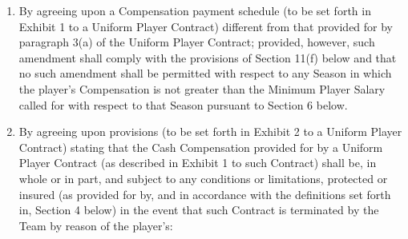 \documentclass[
]{book}
\begin{document}
\begin{enumerate}
\item
  By agreeing upon a Compensation payment schedule (to be set forth in Exhibit 1 to a Uniform Player Contract) different from that provided for by paragraph 3(a) of the Uniform Player Contract; provided, however, such amendment shall comply with the provisions of Section 11(f) below and that no such amendment shall be permitted with respect to any Season in which the player's Compensation is not greater than the Minimum Player Salary called for with respect to that Season pursuant to Section 6 below.
\item
  By agreeing upon provisions (to be set forth in Exhibit 2 to a Uniform Player Contract) stating that the Cash Compensation provided for by a Uniform Player Contract (as described in Exhibit 1 to such Contract) shall be, in whole or in part, and subject to any conditions or limitations, protected or insured (as provided for by, and in accordance with the definitions set forth in, Section 4 below) in the event that such Contract is terminated by the Team by reason of the player's:


\end{enumerate}
\end{document}
